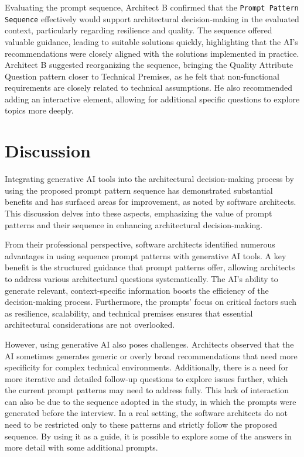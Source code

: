 \documentclass[runningheads]{llncs}
\begin{document}
Evaluating the prompt sequence, Architect B confirmed that the \texttt{Prompt Pattern Sequence} effectively would support architectural decision-making in the evaluated context, particularly regarding resilience and quality. The sequence offered valuable guidance, leading to suitable solutions quickly, highlighting that the AI’s recommendations were closely aligned with the solutions implemented in practice. Architect B suggested reorganizing the sequence, bringing the Quality Attribute Question pattern closer to Technical Premises, as he felt that non-functional requirements are closely related to technical assumptions. He also recommended adding an interactive element, allowing for additional specific questions to explore topics more deeply.

\section{Discussion}

Integrating generative AI tools into the architectural decision-making process by using the proposed prompt pattern sequence has demonstrated substantial benefits and has surfaced areas for improvement, as noted by software architects. This discussion delves into these aspects, emphasizing the value of prompt patterns and their sequence in enhancing architectural decision-making.

From their professional perspective, software architects identified numerous advantages in using sequence prompt patterns with generative AI tools. A key benefit is the structured guidance that prompt patterns offer, allowing architects to address various architectural questions systematically. The AI’s ability to generate relevant, context-specific information boosts the efficiency of the decision-making process. Furthermore, the prompts’ focus on critical factors such as resilience, scalability, and technical premises ensures that essential architectural considerations are not overlooked.

However, using generative AI also poses challenges. Architects observed that the AI sometimes generates generic or overly broad recommendations that need more specificity for complex technical environments. Additionally, there is a need for more iterative and detailed follow-up questions to explore issues further, which the current prompt patterns may need to address fully. This lack of interaction can also be due to the sequence adopted in the study, in which the prompts were generated before the interview. In a real setting, the software architects do not need to be restricted only to these patterns and strictly follow the proposed sequence. By using it as a guide, it is possible to explore some of the answers in more detail with some additional prompts.
\end{document}
